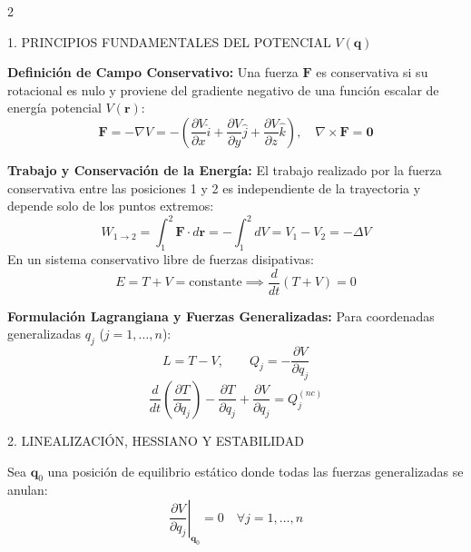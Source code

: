 \documentclass[10pt,a4paper]{article}
\newcommand{\seccion}[1]{%
  \vspace{2mm}%
  \noindent\colorbox{urlblue}{\parbox{\dimexpr\linewidth-2\fboxsep\relax}{%
    \color{white}\footnotesize\bfseries\strut\MakeUppercase{#1}}}%
  \vspace{1.5mm}%
}
\begin{document}
\begin{multicols}{2}

\seccion{1. Principios Fundamentales del Potencial $V(\mathbf{q})$}

\textbf{Definición de Campo Conservativo:}
Una fuerza $\mathbf{F}$ es conservativa si su rotacional es nulo y proviene del gradiente negativo de una función escalar de energía potencial $V(\mathbf{r})$:
\begin{equation*}
  \mathbf{F} = -\nabla V = -\left(\frac{\partial V}{\partial x}\hat{i} + \frac{\partial V}{\partial y}\hat{j} + \frac{\partial V}{\partial z}\hat{k}\right),
  \quad \nabla \times \mathbf{F} = \mathbf{0}
\end{equation*}

\textbf{Trabajo y Conservación de la Energía:}
El trabajo realizado por la fuerza conservativa entre las posiciones 1 y 2 es independiente de la trayectoria y depende solo de los puntos extremos:
\begin{equation*}
  W_{1\to 2} = \int_{1}^{2} \mathbf{F}\cdot d\mathbf{r} = -\int_{1}^{2} dV = V_1 - V_2 = -\Delta V
\end{equation*}
En un sistema conservativo libre de fuerzas disipativas:
\begin{equation*}
  E = T + V = \text{constante} \implies \frac{d}{dt}(T + V) = 0
\end{equation*}

\textbf{Formulación Lagrangiana y Fuerzas Generalizadas:}
Para coordenadas generalizadas $q_j$ ($j = 1, \dots, n$):
\begin{equation*}
  L = T - V, \qquad Q_j = -\frac{\partial V}{\partial q_j}
\end{equation*}
\begin{equation*}
  \frac{d}{dt}\left(\frac{\partial T}{\partial \dot{q}_j}\right) - \frac{\partial T}{\partial q_j} + \frac{\partial V}{\partial q_j} = Q_j^{(nc)}
\end{equation*}

\seccion{2. Linealización, Hessiano y Estabilidad}

Sea $\mathbf{q}_0$ una posición de equilibrio estático donde todas las fuerzas generalizadas se anulan:
\begin{equation*}
  \left. \frac{\partial V}{\partial q_j} \right|_{\mathbf{q}_0} = 0 \quad \forall j=1,\dots,n
\end{equation*}


\end{multicols}
\end{document}
